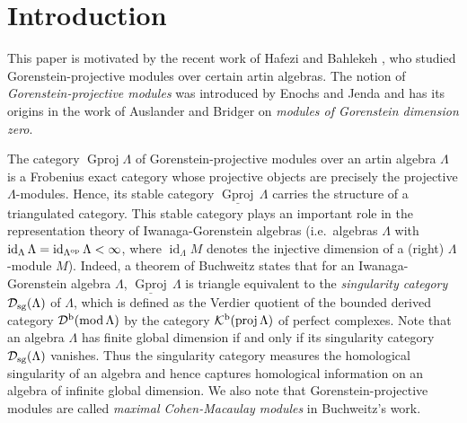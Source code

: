 \documentclass[12pt]{amsart}
\numberwithin{equation}{subsection}
\theoremstyle{plain}
\theoremstyle{definition}
\renewcommand{\mod}{\mathrm{mod}\,}
\newcommand{\proj}{\operatorname{proj}}
\newcommand{\Gproj}{\operatorname{Gproj}}
\newcommand{\sGproj}{\underline{\operatorname{Gproj}}\,}
\newcommand{\injdim}{\operatorname{id}}
\renewcommand{\L}{\Lambda}
\newcommand{\D}{\mathcal{D}}
\newcommand{\K}{\mathcal{K}}
\newcommand{\op}{{\rm op}}
\begin{document}
\maketitle
\tableofcontents





\section{Introduction}


This paper is motivated by the recent work of Hafezi and Bahlekeh \cite{Hafezi-Bahlekeh_2024}, who studied Gorenstein-projective  modules over certain artin algebras.
The notion of {\it Gorenstein-projective modules} was introduced by Enochs and Jenda \cite{Enochs-Jenda_1995_MathZ} and has its origins in the work of Auslander and Bridger \cite{Auslander-Bridger_1969} on {\it modules of Gorenstein dimension zero}.





The category $\Gproj\L$ of Gorenstein-projective modules over an artin algebra $\L$ is a Frobenius exact category whose projective objects are precisely the projective $\L$-modules.
Hence, its stable category $\sGproj\L$ carries the structure of a  triangulated category.
This stable category plays an important role in the representation theory of Iwanaga-Gorenstein algebras 
(i.e.~algebras $\L$ with  $\injdim_\L\L=\injdim_{\L^\op}\L<\infty$, where $\injdim_\L M$ denotes the injective dimension of a (right) $\L$-module $M$).
Indeed, a theorem of Buchweitz \cite{Buchweitz_1986} states that for an Iwanaga-Gorenstein algebra $\L$, $\sGproj\L$ is triangle equivalent to the {\it singularity category} $\D_{\rm sg}(\L)$ of $\L$, which is defined as the Verdier quotient of the bounded derived category $\D^{\rm b}(\mod \L)$ by the category $\K^{\rm b}(\proj \L)$ of perfect complexes. 
Note that an algebra $\L$ has finite global dimension if and only if its singularity category $\D_{\rm sg}(\L)$ vanishes.
Thus the singularity category measures the homological singularity of an algebra and hence captures homological information on an algebra of infinite global dimension. 
We also note that Gorenstein-projective modules are called {\it maximal Cohen-Macaulay modules} in Buchweitz's work. 
\end{document}

